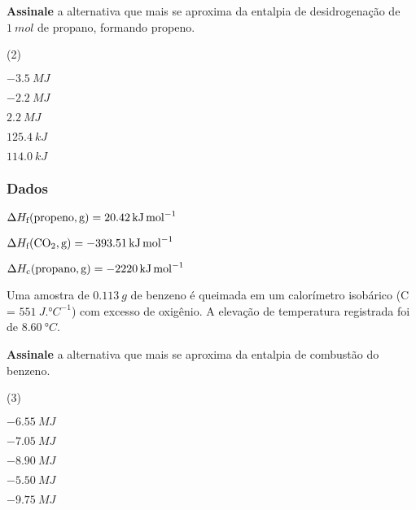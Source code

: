 \documentclass[braun, twocolumn]{braun}
\begin{document}
\begin{problem}
[2A22]\textbf{Assinale} a alternativa que mais se aproxima da entalpia de
desidrogenação de \(\qty{1}{mol}\) de propano, formando propeno.


\begin{choices}
(2)
\item \(\qty{-3,5}{MJ}\)

\item \(\qty{-2,2}{MJ}\)

\item \(\qty{+2,2}{MJ}\)

\item \(\qty{+125,4}{kJ}\)

\item \(\qty{+114,0}{kJ}\)

\end{choices}
\subsubsection*{Dados}


\begin{datalist}

\item $\Delta H_\text{f}(\ce{propeno, {g}}) = \qty{20,42}{kJ.mol^{-1}}$
\item $\Delta H_\text{f}(\ce{CO2, {g}}) = \qty{-393,51}{kJ.mol^{-1}}$
\item $\Delta H_\text{c}(\ce{propano, {g}}) = \qty{-2220}{kJ.mol^{-1}}$
\end{datalist}

\end{problem}



\begin{problem}
[2A23]Uma amostra de \(\qty{0,113}{g}\) de benzeno é queimada em um calorímetro
isobárico (C = \(\qty{551}{J.\degree C^{-1}}\)) com excesso de oxigênio. A
elevação de temperatura registrada foi de \(\qty{8,60}{\degree C}\).

\textbf{Assinale} a alternativa que mais se aproxima da entalpia de
combustão do benzeno.


\begin{choices}
(3)
\item \(\qty{-6,55}{MJ}\)

\item \(\qty{-7,05}{MJ}\)

\item \(\qty{-8,90}{MJ}\)

\item \(\qty{-5,50}{MJ}\)

\item \(\qty{-9,75}{MJ}\)

\end{choices}

\end{problem}
\end{document}
